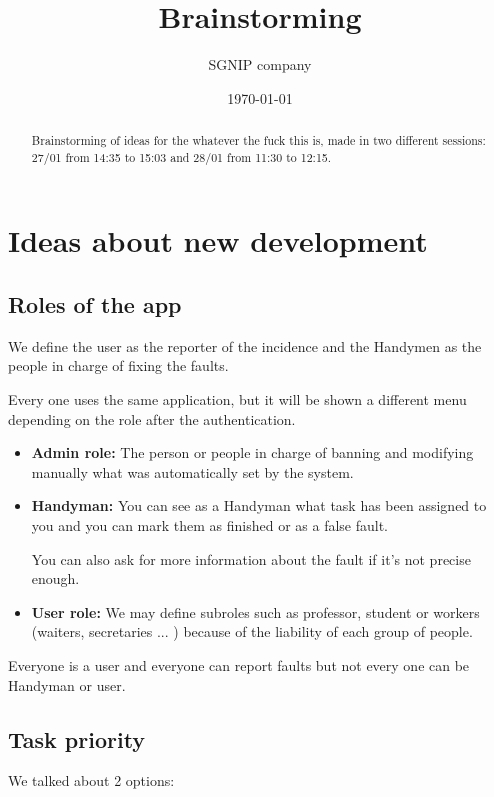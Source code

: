 \documentclass{article}
\title{Brainstorming}
\date{\today}
\author{SGNIP company}
\newcommand{\tbg}{Handyman\xspace}
\newcommand{\tbgs}{Handymen\xspace}
\begin{document}
\maketitle

\tableofcontents

\pagestyle{plain}

\begin{abstract} Brainstorming of ideas for the whatever the fuck this is, made in two different sessions: 27/01 from 14:35 to 15:03 and 28/01 from 11:30 to 12:15.
\end{abstract}

\section{Ideas about new development}

\subsection{Roles of the app}

We define the user as the reporter of the incidence and the \tbgs as the people in charge of fixing the faults.

Every one uses the same application, but it will be shown a different menu depending on the role after the authentication.

\begin{itemize}
\item \textbf{Admin role: } The person or people in charge of banning and modifying manually what was automatically set by the system.

\item\textbf{\tbg:} You can see as a \tbg what task has been assigned to you and you can mark them as finished or as a false fault.

You can also ask for more information about the fault if it's not precise enough.

\item \textbf{User role: }  We may define subroles such as professor, student or workers (waiters, secretaries ... ) because of the liability of each group of people.

\end{itemize}

Everyone is a user and everyone can report faults but not  every one can be \tbg or user.

\subsection{Task priority}
We talked about 2 options:
\end{document}
